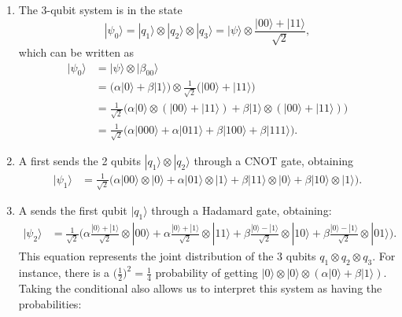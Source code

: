 \documentclass{article}
\theoremstyle{definition}
\begin{document}

\begin{enumerate}
  \item The 3-qubit system is in the state
    \[|\psi_0 \rangle = |q_1 \rangle \otimes |q_2 \rangle \otimes |q_3 \rangle = |\psi \rangle \otimes \frac{|00\rangle + |11\rangle}{\sqrt{2}},\]
    which can be written as
    \begin{align*}
      |\psi_0 \rangle & = |\psi \rangle \otimes |\beta_{00}\rangle \\
      & = \big( \alpha |0\rangle + \beta |1\rangle \big) \otimes \frac{1}{\sqrt{2}} \big( |00\rangle + |11\rangle \big) \\
      & = \frac{1}{\sqrt{2}} \Big( \alpha |0\rangle \otimes (|00\rangle + |11\rangle ) + \beta |1\rangle \otimes (|00\rangle + |11\rangle )\Big) \\
      & = \frac{1}{\sqrt{2}} \Big( \alpha |000\rangle + \alpha |011\rangle + \beta |100\rangle + \beta |111\rangle\Big).
    \end{align*}
  \item A first sends the 2 qubits $|q_1 \rangle \otimes |q_2 \rangle$ through a CNOT gate, obtaining
    \begin{align*}
      |\psi_1 \rangle & = \frac{1}{\sqrt{2}} \big( \alpha |00\rangle \otimes |0\rangle + \alpha |01\rangle \otimes |1\rangle + \beta |11\rangle \otimes |0\rangle + \beta |10\rangle \otimes |1\rangle \big).
    \end{align*}
  \item A sends the first qubit $|q_1\rangle$ through a Hadamard gate, obtaining:
    \begin{align*}
      |\psi_2 \rangle & = \frac{1}{\sqrt{2}} \bigg( \alpha \frac{|0\rangle + |1\rangle}{\sqrt{2}} \otimes |00\rangle + \alpha \frac{|0\rangle + |1\rangle}{\sqrt{2}} \otimes |11\rangle + \beta \frac{|0\rangle - |1\rangle}{\sqrt{2}} \otimes |10 \rangle + \beta \frac{|0\rangle - |1\rangle}{\sqrt{2}} \otimes |01 \rangle \bigg).
    \end{align*}
    This equation represents the joint distribution of the 3 qubits $q_1 \otimes q_2 \otimes q_3$. For instance, there is a $\Big(\frac{1}{2} \Big)^2 = \frac{1}{4}$ probability of getting $|0\rangle \otimes |0\rangle \otimes (\alpha |0\rangle + \beta |1\rangle)$. Taking the conditional also allows us to interpret this system as having the probabilities:

\end{enumerate}
\end{document}
